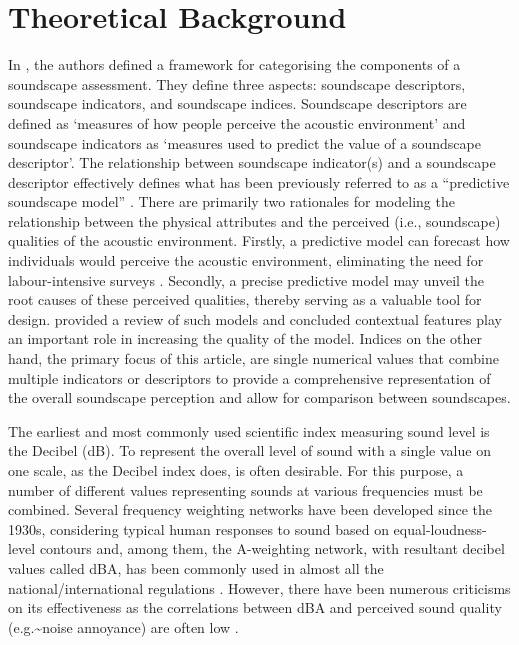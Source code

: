 \documentclass[
  authoryear,
  3p]{elsarticle}
\begin{document}
\section{Theoretical Background}\label{sec-theoretical-background}

In \citet{Aletta2016Soundscape}, the authors defined a framework for
categorising the components of a soundscape assessment. They define
three aspects: soundscape descriptors, soundscape indicators, and
soundscape indices. Soundscape descriptors are defined as `measures of
how people perceive the acoustic environment' and soundscape indicators
as `measures used to predict the value of a soundscape descriptor'. The
relationship between soundscape indicator(s) and a soundscape descriptor
effectively defines what has been previously referred to as a
``predictive soundscape model''
\citep{Aletta2016Soundscape, Mitchell2022Predictive}. There are
primarily two rationales for modeling the relationship between the
physical attributes and the perceived (i.e., soundscape) qualities of
the acoustic environment. Firstly, a predictive model can forecast how
individuals would perceive the acoustic environment, eliminating the
need for labour-intensive surveys \citep{Mitchell2023conceptual}.
Secondly, a precise predictive model may unveil the root causes of these
perceived qualities, thereby serving as a valuable tool for design.
\citet{Lionello2020systematic} provided a review of such models and
concluded contextual features play an important role in increasing the
quality of the model. Indices on the other hand, the primary focus of
this article, are single numerical values that combine multiple
indicators or descriptors to provide a comprehensive representation of
the overall soundscape perception and allow for comparison between
soundscapes.

The earliest and most commonly used scientific index measuring sound
level is the Decibel (dB). To represent the overall level of sound with
a single value on one scale, as the Decibel index does, is often
desirable. For this purpose, a number of different values representing
sounds at various frequencies must be combined. Several frequency
weighting networks have been developed since the 1930s, considering
typical human responses to sound based on equal-loudness-level contours
\citep{Fletcher1933Loudness} and, among them, the A-weighting network,
with resultant decibel values called dBA, has been commonly used in
almost all the national/international regulations
\citep{Kryter1994Handbook}. However, there have been numerous criticisms
on its effectiveness \citep{Parmanen2007weighted} as the correlations
between dBA and perceived sound quality (e.g.\textasciitilde noise
annoyance) are often low \citep{Hellman1987Why}.
\end{document}
